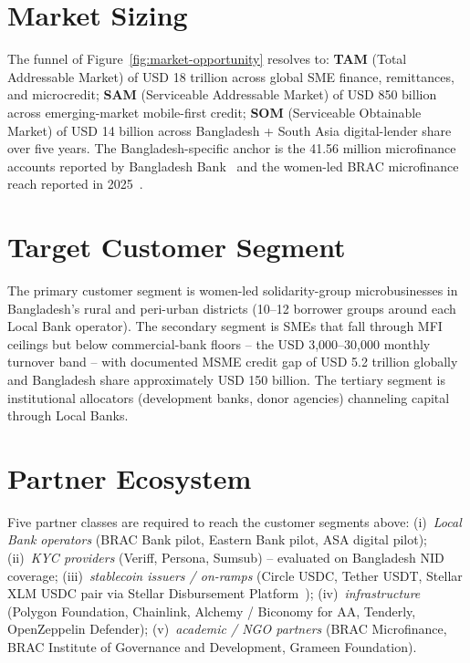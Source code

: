 \documentclass[12pt,a4paper]{report}
\begin{document}
\section{Market Sizing}
\label{sec:market-sizing}

The funnel of Figure~\ref{fig:market-opportunity} resolves to: \textbf{TAM} (Total Addressable Market) of USD 18 trillion across global SME finance, remittances, and microcredit; \textbf{SAM} (Serviceable Addressable Market) of USD 850 billion across emerging-market mobile-first credit; \textbf{SOM} (Serviceable Obtainable Market) of USD 14 billion across Bangladesh + South Asia digital-lender share over five years. The Bangladesh-specific anchor is the 41.56 million microfinance accounts reported by Bangladesh Bank~\cite{bangladeshBank2025} and the women-led BRAC microfinance reach reported in 2025~\cite{brac2025microfinance}.

\section{Target Customer Segment}
\label{sec:customer}

The primary customer segment is women-led solidarity-group microbusinesses in Bangladesh's rural and peri-urban districts (10--12 borrower groups around each Local Bank operator). The secondary segment is SMEs that fall through MFI ceilings but below commercial-bank floors -- the USD 3,000--30,000 monthly turnover band -- with documented MSME credit gap of USD 5.2 trillion globally~\cite{ifc2019msme} and Bangladesh share approximately USD 150 billion. The tertiary segment is institutional allocators (development banks, donor agencies) channeling capital through Local Banks.

\section{Partner Ecosystem}
\label{sec:partner}

Five partner classes are required to reach the customer segments above: (i)~\textit{Local Bank operators} (BRAC Bank pilot, Eastern Bank pilot, ASA digital pilot); (ii)~\textit{KYC providers} (Veriff, Persona, Sumsub) -- evaluated on Bangladesh NID coverage; (iii)~\textit{stablecoin issuers / on-ramps} (Circle USDC, Tether USDT, Stellar XLM USDC pair via Stellar Disbursement Platform~\cite{stellar2025report}); (iv)~\textit{infrastructure} (Polygon Foundation, Chainlink, Alchemy / Biconomy for AA, Tenderly, OpenZeppelin Defender); (v)~\textit{academic / NGO partners} (BRAC Microfinance, BRAC Institute of Governance and Development, Grameen Foundation).
\end{document}
